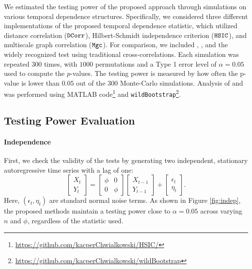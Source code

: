 We estimated the testing power of the proposed approach through simulations on various temporal dependence structures. Specifically, we considered three different implementations of the proposed temporal dependence statistic, which utilized distance correlation ($\operatorname{\mathtt{DCorr}}$), Hilbert-Schmidt independence criterion ($\texttt{HSIC}$), and multiscale graph correlation ($\mathtt{Mgc}$). For comparison, we included \shift{} \cite{shifthsic}, \wild{} \cite{wildhsic}, and the widely recognized \texttt{\LB{}} test \cite{LB} using traditional cross-correlations. Each simulation was repeated $300$ times, with $1000$ permutations and a Type 1 error level of $\alpha=0.05$ used to compute the $p$-values. The testing power is measured by how often the p-value is lower than $0.05$ out of the $300$ Monte-Carlo simulations. Analysis of \shift{} and \wild{} was performed using MATLAB code\footnote{\url{https://github.com/kacperChwialkowski/HSIC/}} and \texttt{wildBootstrap}\footnote{\url{https://github.com/kacperChwialkowski/wildBootstrap}}.

\subsection{Testing Power Evaluation}
 \paragraph{Independence}
 First, we check the validity of the tests by generating two independent, stationary autoregressive time series with a lag of one:
 \begin{equation*}
     \begin{bmatrix}
     X_t\\
    Y_t
    \end{bmatrix}
     =
     \begin{bmatrix}
     \phi & 0\\
     0 & \phi
     \end{bmatrix}
     \begin{bmatrix}
     X_{t-1}\\
     Y_{t-1}
     \end{bmatrix}
     +
     \begin{bmatrix}
     \epsilon_t\\
     \eta_t
     \end{bmatrix}.
 \end{equation*}
 Here, $(\epsilon_t,\eta_t)$ are standard normal noise terms. As shown in Figure \ref{fig:indep}, the proposed methods maintain a testing power close to $\alpha=0.05$ across varying $n$ and $\phi$, regardless of the statistic used.

